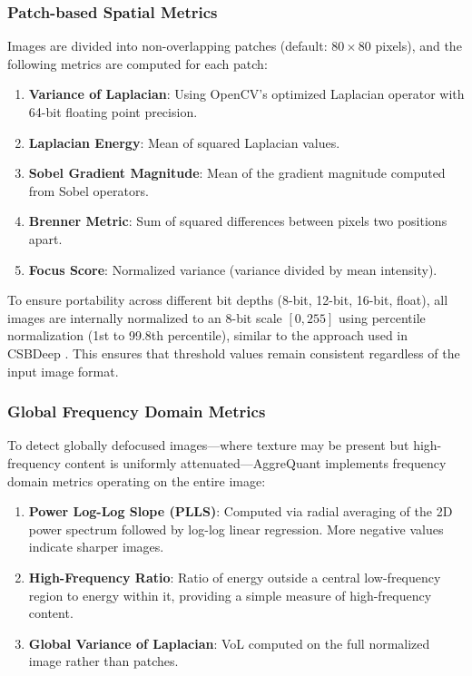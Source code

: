 \subsubsection{Patch-based Spatial Metrics}

Images are divided into non-overlapping patches (default: $80 \times 80$ pixels), and the following metrics are computed for each patch:

\begin{enumerate}
    \item \textbf{Variance of Laplacian}: Using OpenCV's optimized Laplacian operator with 64-bit floating point precision.
    \item \textbf{Laplacian Energy}: Mean of squared Laplacian values.
    \item \textbf{Sobel Gradient Magnitude}: Mean of the gradient magnitude computed from Sobel operators.
    \item \textbf{Brenner Metric}: Sum of squared differences between pixels two positions apart.
    \item \textbf{Focus Score}: Normalized variance (variance divided by mean intensity).
\end{enumerate}

To ensure portability across different bit depths (8-bit, 12-bit, 16-bit, float), all images are internally normalized to an 8-bit scale $[0, 255]$ using percentile normalization (1st to 99.8th percentile), similar to the approach used in CSBDeep \cite{weigert2018content}. This ensures that threshold values remain consistent regardless of the input image format.

\subsubsection{Global Frequency Domain Metrics}

To detect globally defocused images---where texture may be present but high-frequency content is uniformly attenuated---AggreQuant implements frequency domain metrics operating on the entire image:

\begin{enumerate}
    \item \textbf{Power Log-Log Slope (PLLS)}: Computed via radial averaging of the 2D power spectrum followed by log-log linear regression. More negative values indicate sharper images.
    \item \textbf{High-Frequency Ratio}: Ratio of energy outside a central low-frequency region to energy within it, providing a simple measure of high-frequency content.
    \item \textbf{Global Variance of Laplacian}: VoL computed on the full normalized image rather than patches.
\end{enumerate}

